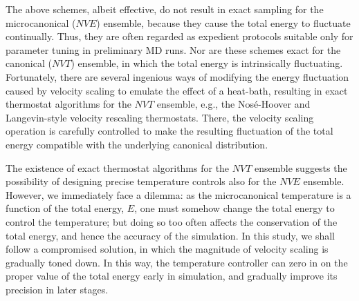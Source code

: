 \documentclass[reprint]{revtex4-1}
\begin{document}
The above schemes, albeit effective,
do not result in exact sampling for the microcanonical ($NVE$) ensemble\cite{hermansson1988},
because they cause the total energy to fluctuate continually.
%
Thus, they are often regarded as expedient protocols
suitable only for parameter tuning in preliminary MD runs.
%
Nor are these schemes exact for the canonical ($NVT$) ensemble,
in which the total energy is intrinsically fluctuating.
%
Fortunately, there are several ingenious ways
of modifying the energy fluctuation caused by velocity scaling
to emulate the effect of a heat-bath,
resulting in exact thermostat algorithms for the $NVT$ ensemble,
e.g., the Nos\'e-Hoover\cite{nose1984, nose1984mp, hoover1985, martyna1992}
and Langevin-style velocity rescaling\cite{bussi2007} thermostats.
%
There,
the velocity scaling operation is carefully
controlled to make
the resulting fluctuation of the total energy
compatible with the underlying canonical distribution.


The existence of exact thermostat algorithms for the $NVT$ ensemble
suggests the possibility of designing
precise temperature controls also
for the $NVE$ ensemble.
%
However, we immediately face a dilemma:
%
as the microcanonical temperature is a function of the total energy, $E$,
one must somehow change the total energy to control the temperature;
%
but doing so too often affects the conservation of the total energy,
and hence the accuracy of the simulation\cite{hermansson1988}.
%
In this study, we shall follow a compromised solution,
in which the magnitude of velocity scaling is gradually toned down.
%
In this way,
the temperature controller can
zero in on
the proper value of the total energy
early in simulation,
and gradually improve its precision
in later stages.
\end{document}
